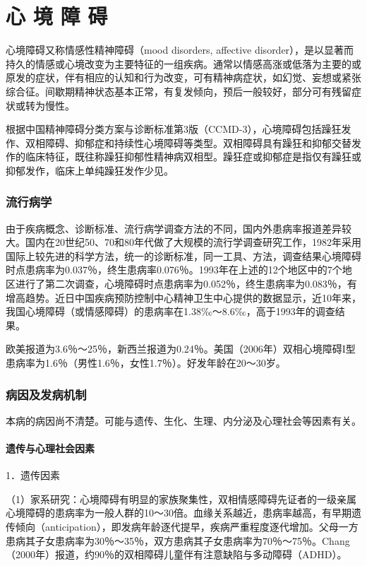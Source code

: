 \chapter{心 境 障 碍}

心境障碍又称情感性精神障碍（mood disorders, affective
disorder），是以显著而持久的情感或心境改变为主要特征的一组疾病。通常以情感高涨或低落为主要的或原发的症状，伴有相应的认知和行为改变，可有精神病症状，如幻觉、妄想或紧张综合征。间歇期精神状态基本正常，有复发倾向，预后一般较好，部分可有残留症状或转为慢性。

根据中国精神障碍分类方案与诊断标准第3版（CCMD-3），心境障碍包括躁狂发作、双相障碍、抑郁症和持续性心境障碍等类型。双相障碍具有躁狂和抑郁交替发作的临床特征，既往称躁狂抑郁性精神病双相型。躁狂症或抑郁症是指仅有躁狂或抑郁发作，临床上单纯躁狂发作少见。

\subsection{流行病学}

由于疾病概念、诊断标准、流行病学调查方法的不同，国内外患病率报道差异较大。国内在20世纪50、70和80年代做了大规模的流行学调查研究工作，1982年采用国际上较先进的科学方法，统一的诊断标准，同一工具、方法，调查结果心境障碍时点患病率为0.037％，终生患病率0.076％。1993年在上述的12个地区中的7个地区进行了第二次调查，心境障碍时点患病率为0.052％，终生患病率为0.083％，有增高趋势。近日中国疾病预防控制中心精神卫生中心提供的数据显示，近10年来，我国心境障碍（或情感障碍）的患病率在1.38‰～8.6‰，高于1993年的调查结果。

欧美报道为3.6％～25％，新西兰报道为0.24％。美国（2006年）双相心境障碍I型患病率为1.6％（男性1.6％，女性1.7％）。好发年龄在20～30岁。

\subsection{病因及发病机制}

本病的病因尚不清楚。可能与遗传、生化、生理、内分泌及心理社会等因素有关。

\subsubsection{遗传与心理社会因素}

1．遗传因素

（1）家系研究：心境障碍有明显的家族聚集性，双相情感障碍先证者的一级亲属心境障碍的患病率为一般人群的10～30倍。血缘关系越近，患病率越高，有早期遗传倾向（anticipation），即发病年龄逐代提早，疾病严重程度逐代增加。父母一方患病其子女患病率为30％～35％，双方患病其子女患病率为70％～75％。Chang（2000年）报道，约90％的双相障碍儿童伴有注意缺陷与多动障碍（ADHD）。

